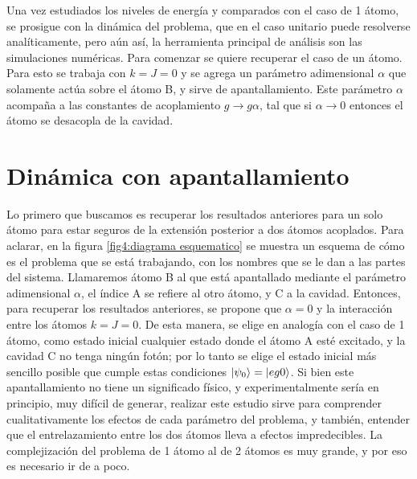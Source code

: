 Una vez estudiados los niveles de energía y comparados con el caso de 1 átomo, se prosigue con la dinámica del problema, que en el caso unitario puede resolverse analíticamente, pero a\'un así, la herramienta principal de análisis son las simulaciones numéricas.
Para comenzar se quiere recuperar el caso de un átomo. Para esto se trabaja con $k=J=0$ y se agrega un parámetro adimensional $\alpha$ que solamente actúa sobre el átomo B, y sirve de apantallamiento. Este parámetro $\alpha$ acompaña a las constantes de acoplamiento $g\rightarrow g\alpha$, tal que si $\alpha \rightarrow 0$ entonces el átomo se desacopla de la cavidad. 

\section{Dinámica con apantallamiento}
\label{sec4:dinamica apantallamiento}
Lo primero que buscamos es recuperar los resultados anteriores para un solo átomo para estar seguros de la extensión posterior a dos átomos acoplados. Para aclarar, en la figura \ref{fig4:diagrama esquematico} se muestra un esquema de cómo es el problema que se está trabajando, con los nombres que se le dan a las partes del sistema. Llamaremos átomo B al que está apantallado mediante el parámetro adimensional $\alpha$, el índice A se refiere al otro átomo, y C a la cavidad. Entonces, para recuperar los resultados anteriores, se propone que $\alpha=0$ y la interacción entre los átomos $k=J=0$. De esta manera, se elige en analogía con el caso de 1 átomo, como estado inicial cualquier estado donde el átomo A esté excitado, y la cavidad C no tenga ningún fotón; por lo tanto se elige el estado inicial más sencillo posible que cumple estas condiciones $\ket{\psi_0}=\ket{eg0}$. Si bien este apantallamiento no tiene un significado físico, y experimentalmente sería en principio, muy difícil de generar, realizar este estudio sirve para comprender cualitativamente los efectos de cada parámetro del problema, y también, entender que el entrelazamiento entre los dos átomos lleva a efectos impredecibles. La complejización del problema de 1 átomo al de 2 átomos es muy grande, y por eso es necesario ir de a poco.
